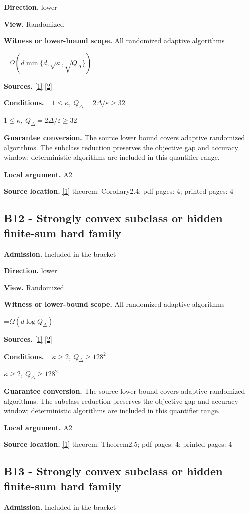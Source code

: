 \documentclass[10pt,a4paper]{article}
\newcommand{\AtlasMath}[1]{\par\begingroup\centering\setbox0=\hbox{$\displaystyle #1$}\ifdim\wd0>1.4\linewidth\typeout{ATLAS WIDE FORMULA: \the\wd0}\fi\ifdim\wd0>\linewidth\resizebox{\linewidth}{!}{\box0}\else\box0\fi\par\endgroup}
\newcommand{\AtlasInlineMath}[1]{\begingroup\setbox0=\hbox{$#1$}\ifdim\wd0>.4\linewidth\endgroup\AtlasMath{#1}\else\endgroup$#1$\fi}
\begin{document}
\textbf{Direction.} lower

\textbf{View.} Randomized

\textbf{Witness or lower-bound scope.} All randomized adaptive algorithms

\AtlasMath{\Omega(d\min\{d,\sqrt\kappa,\sqrt{Q_\Delta}\})}
\textbf{Sources.} \href{https://arxiv.org/html/2610.00345v1}{[1]} \href{https://arxiv.org/html/2609.00045v3}{[2]}

\textbf{Conditions.} \AtlasInlineMath{1\le\kappa,\ Q_\Delta=2\Delta/\varepsilon\ge32}

\textbf{Guarantee conversion.} The source lower bound covers adaptive randomized algorithms. The subclass reduction preserves the objective gap and accuracy window; deterministic algorithms are included in this quantifier range.

\textbf{Local argument.} A2

\textbf{Source location.} \href{https://arxiv.org/html/2610.00345v1}{[1]} theorem: Corollary2.4; pdf pages: 4; printed pages: 4

\subsection{B12 - Strongly convex subclass or hidden finite-sum hard family}
\textbf{Admission.} Included in the bracket

\textbf{Direction.} lower

\textbf{View.} Randomized

\textbf{Witness or lower-bound scope.} All randomized adaptive algorithms

\AtlasMath{\Omega(d\log Q_\Delta)}
\textbf{Sources.} \href{https://arxiv.org/html/2610.00345v1}{[1]} \href{https://arxiv.org/html/2609.00045v3}{[2]}

\textbf{Conditions.} \AtlasInlineMath{\kappa\ge2,\ Q_\Delta\ge128^2}

\textbf{Guarantee conversion.} The source lower bound covers adaptive randomized algorithms. The subclass reduction preserves the objective gap and accuracy window; deterministic algorithms are included in this quantifier range.

\textbf{Local argument.} A2

\textbf{Source location.} \href{https://arxiv.org/html/2610.00345v1}{[1]} theorem: Theorem2.5; pdf pages: 4; printed pages: 4

\subsection{B13 - Strongly convex subclass or hidden finite-sum hard family}
\textbf{Admission.} Included in the bracket
\end{document}
